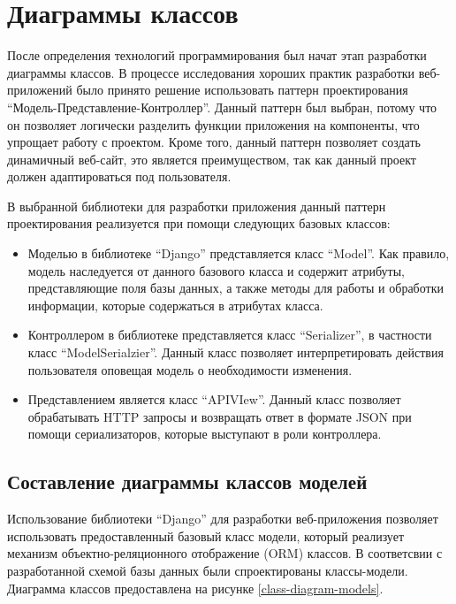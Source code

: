 \chapter{Диаграммы классов}
    После определения технологий программирования был начат этап %
    разработки диаграммы классов. В процессе исследования хороших %
    практик разработки веб-приложений было принято решение использовать %
    паттерн проектирования “Модель-Представление-Контроллер”. Данный %
    паттерн был выбран, потому что он позволяет логически разделить %
    функции приложения на компоненты, что упрощает работу с проектом. %
    Кроме того, данный паттерн позволяет создать динамичный веб-сайт, %
    это является преимуществом, так как данный проект должен адаптироваться %
    под пользователя.

    В выбранной библиотеки для разработки приложения данный паттерн %
    проектирования реализуется при помощи следующих базовых классов:
    \begin{itemize}
        \item Моделью в библиотеке “Django” представляется класс “Model”. %
        Как правило, модель наследуется от данного базового класса и содержит %
        атрибуты, представляющие поля базы данных, а также методы для работы и %
        обработки информации, которые содержаться в атрибутах класса.
        \item Контроллером в библиотеке представляется класс “Serializer”, %
        в частности класс “ModelSerialzier”. Данный класс позволяет интерпретировать %
        действия пользователя оповещая модель о необходимости изменения.
        \item Представлением является класс “APIVIew”. %
        Данный класс позволяет обрабатывать HTTP запросы и возвращать %
        ответ в формате JSON при помощи сериализаторов, которые выступают в роли  контроллера. 
    \end{itemize}

    \section{Составление диаграммы классов моделей}
        Использование библиотеки “Django” \cite{django} для %
        разработки веб-приложения позволяет использовать предоставленный %
        базовый класс модели, который реализует механизм  объектно-реляционного %
        отображение (ORM) классов. В соответсвии с разработанной схемой базы данных %
        были спроектированы классы-модели. Диаграмма классов предоставлена %
        на рисунке \ref{class-diagram-models}.

